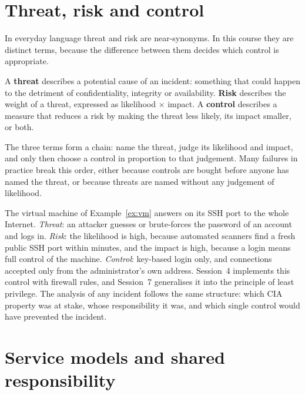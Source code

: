 \section{Threat, risk and control}

In everyday language threat and risk are near-synonyms. In this course they
are distinct terms, because the difference between them decides which
control is appropriate.

\begin{definition}\label{def:trc}
A \textbf{threat} describes a potential cause of an incident: something that
could happen to the detriment of confidentiality, integrity or availability.
\textbf{Risk} describes the weight of a threat, expressed as likelihood
$\times$ impact. A \textbf{control} describes a measure that reduces a risk by
making the threat less likely, its impact smaller, or both.
\end{definition}

The three terms form a chain: name the threat, judge its likelihood and
impact, and only then choose a control in proportion to that judgement. Many
failures in practice break this order, either because controls are bought
before anyone has named the threat, or because threats are named without any
judgement of likelihood.

\begin{example}\label{ex:ssh-trc}
The virtual machine of Example~\ref{ex:vm} answers on its SSH port to the whole
Internet. \emph{Threat}: an attacker guesses or brute-forces the password of an
account and logs in. \emph{Risk}: the likelihood is high, because automated
scanners find a fresh public SSH port within minutes, and the impact is high,
because a login means full control of the machine. \emph{Control}: key-based
login only, and connections accepted only from the administrator's own address.
Session~4 implements this control with firewall rules, and Session~7
generalises it into the principle of least privilege. The analysis of any
incident follows the same structure: which CIA property was at stake, whose
responsibility it was, and which single control would have prevented the
incident.
\end{example}

\section{Service models and shared responsibility}
\label{sec:servicemodels}

